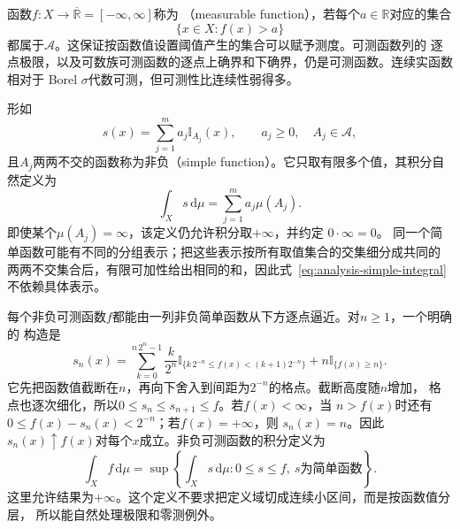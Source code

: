 函数$f:X\to\overline{\mathbb{R}}=[-\infty,\infty]$称为
（measurable function），若每个$a\in\mathbb{R}$对应的集合
\[   \{x\in X:f(x)>a\} \]
都属于$\mathcal{A}$。这保证按函数值设置阈值产生的集合可以赋予测度。可测函数列的
逐点极限，以及可数族可测函数的逐点上确界和下确界，仍是可测函数。连续实函数相对于
Borel $\sigma$代数可测，但可测性比连续性弱得多。

形如
\[   s(x)=\sum_{j=1}^{m}a_j\mathbb{I}_{A_j}(x),   \qquad a_j\geq0,\quad A_j\in\mathcal{A}, \]
且$A_j$两两不交的函数称为非负（simple function）。它只取有限多个值，其积分自然定义为
\begin{equation}
  \int_X s\,\mathrm{d}\mu
  =
  \sum_{j=1}^{m}a_j\mu(A_j).
\label{eq:analysis-simple-integral}
\end{equation}
即使某个$\mu(A_j)=\infty$，该定义仍允许积分取$+\infty$，并约定 $0\cdot\infty=0$。
同一个简单函数可能有不同的分组表示；把这些表示按所有取值集合的交集细分成共同的
两两不交集合后，有限可加性给出相同的和，因此式~\eqref{eq:analysis-simple-integral}
不依赖具体表示。

每个非负可测函数$f$都能由一列非负简单函数从下方逐点逼近。对$n\geq1$，一个明确的
构造是
\begin{equation}
  s_n(x)
  =
  \sum_{k=0}^{n\,2^n-1}
  \frac{k}{2^n}
  \mathbb{I}_{\{k\,2^{-n}\leq f(x)<(k+1)2^{-n}\}}
  +
  n\mathbb{I}_{\{f(x)\geq n\}}.
\label{eq:analysis-canonical-simple-approximation}
\end{equation}
它先把函数值截断在$n$，再向下舍入到间距为$2^{-n}$的格点。截断高度随$n$增加，
格点也逐次细化，所以$0\leq s_n\leq s_{n+1}\leq f$。若$f(x)<\infty$，当
$n>f(x)$时还有$0\leq f(x)-s_n(x)<2^{-n}$；若$f(x)=+\infty$，则
$s_n(x)=n$。因此$s_n(x)\uparrow f(x)$对每个$x$成立。非负可测函数的积分定义为
\begin{equation}
  \int_X f\,\mathrm{d}\mu
  =
  \sup\left\{
    \int_X s\,\mathrm{d}\mu:
    0\leq s\leq f,\ s\text{为简单函数}
  \right\}.
\label{eq:analysis-nonnegative-lebesgue-integral}
\end{equation}
这里允许结果为$+\infty$。这个定义不要求把定义域切成连续小区间，而是按函数值分层， 所以能自然处理极限和零测例外。

